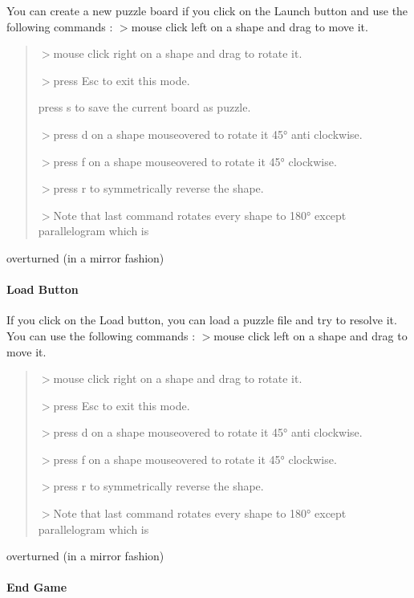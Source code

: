 You can create a new puzzle board if you click on the {\ttfamily Launch} button and use the following commands \+: $>${\ttfamily mouse click left} on a shape and drag to move it. \begin{quote}


$>${\ttfamily mouse click right} on a shape and drag to rotate it.

$>${\ttfamily press \textquotesingle{}Esc\textquotesingle{}} to exit this mode.

{\ttfamily press \textquotesingle{}s\textquotesingle{}} to save the current board as puzzle.

$>${\ttfamily press \textquotesingle{}d\textquotesingle{}} on a shape mouseovered to rotate it 45° anti clockwise.

$>${\ttfamily press \textquotesingle{}f} on a shape mouseovered to rotate it 45° clockwise.

$>${\ttfamily press \textquotesingle{}r\textquotesingle{}} to symmetrically reverse the shape.

$>$Note that last command rotates every shape to 180° except parallelogram which is \end{quote}
overturned (in a mirror fashion)

\paragraph*{Load Button}

If you click on the {\ttfamily Load} button, you can load a puzzle file and try to resolve it. You can use the following commands \+: $>${\ttfamily mouse click left} on a shape and drag to move it. \begin{quote}


$>${\ttfamily mouse click right} on a shape and drag to rotate it.

$>${\ttfamily press \textquotesingle{}Esc\textquotesingle{}} to exit this mode.

$>${\ttfamily press \textquotesingle{}d\textquotesingle{}} on a shape mouseovered to rotate it 45° anti clockwise.

$>${\ttfamily press \textquotesingle{}f} on a shape mouseovered to rotate it 45° clockwise.

$>${\ttfamily press \textquotesingle{}r\textquotesingle{}} to symmetrically reverse the shape.

$>$Note that last command rotates every shape to 180° except parallelogram which is \end{quote}
overturned (in a mirror fashion) \paragraph*{End Game}

